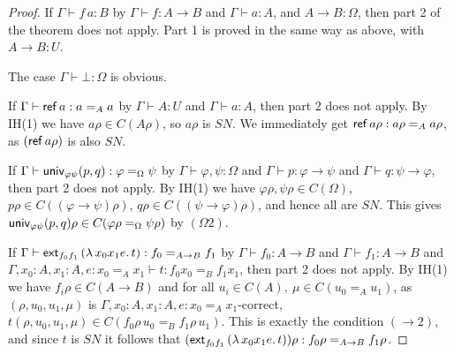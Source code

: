 \documentclass[10pt,a4paper]{article}
\newcommand{\unphsi}{{\univ_{\varphi\psi}}}
\newcommand{\extfs}{{\ext_{f_0 f_1}}}
\newcommand{\SN}{\mathit{SN}}
\newcommand{\Ref}{{\sf ref}}
\newcommand{\ext}{{\sf ext}}
\newcommand{\univ}{{\sf univ}}
\begin{document}
\begin{proof}
If $\Gamma\vdash f\,a:B$ by $\Gamma\vdash f:A{\to}B$ and $\Gamma\vdash a:A$,
and $A{\to}B:\Omega$, then part 2 of the theorem does not apply.
Part 1 is proved in the same way as above, with $A{\to}B:U$.

The case $\Gamma\vdash \bot:\Omega$ is obvious.

If $\Gamma\vdash\Ref\,a: a =_A a$ by $\Gamma\vdash A:U$ and $\Gamma\vdash a:A$,
then part 2 does not apply. By IH(1) we have $a\rho\in C(A\rho)$, so $a\rho$ is $\SN$.
We immediately get $\Ref\,a\rho : a\rho =_A a\rho$, as $(\Ref\,a\rho)$ is also $\SN$.

If $\Gamma\vdash\unphsi(p,q):\varphi =_\Omega \psi$ by 
$\Gamma\vdash \varphi,\psi:\Omega$ and 
$\Gamma\vdash p:\varphi\to\psi$ and
$\Gamma\vdash q:\psi\to\varphi$,
then part 2 does not apply. 
By IH(1) we have $\varphi\rho,\psi\rho\in C(\Omega)$,
$p\rho\in C((\varphi\to\psi)\rho)$,
$q\rho\in C((\psi\to\varphi)\rho)$,
and hence all are $\SN$. This gives
$\unphsi(p,q)\rho\in C(\varphi\rho =_\Omega \psi\rho)$
by $(\Omega2)$.

If $\Gamma\vdash \extfs\,(\lambda\,x_0 x_1 e.\,t): f_0 =_{A\to B} f_1$
by $\Gamma\vdash f_0: A\to B$ and $\Gamma\vdash f_1: A\to B$
and $\Gamma,x_0:A,x_1:A,e: x_0 =_A x_1 \vdash t: f_0 x_0 =_B f_1 x_1$,
then part 2 does not apply. 
By IH(1) we have $f_i\rho\in C({A\to B})$ and for 
all $u_i\in C(A),~\mu\in C(u_0 =_A u_1)$, as $(\rho,u_0,u_1,\mu)$ is
$\Gamma,x_0:A,x_1:A,e: x_0 =_A x_1$-correct, 
$t(\rho,u_0,u_1,\mu) \in C(f_0\rho\,u_0 =_B f_1\rho\,u_1)$.
This is exactly the condition $({\to}2)$, and since $t$ is $\SN$
it follows that $(\extfs\,(\lambda\,x_0 x_1 e.\,t))\rho: f_0\rho=_{A\to B} f_1\rho$.


\end{proof}
\end{document}
